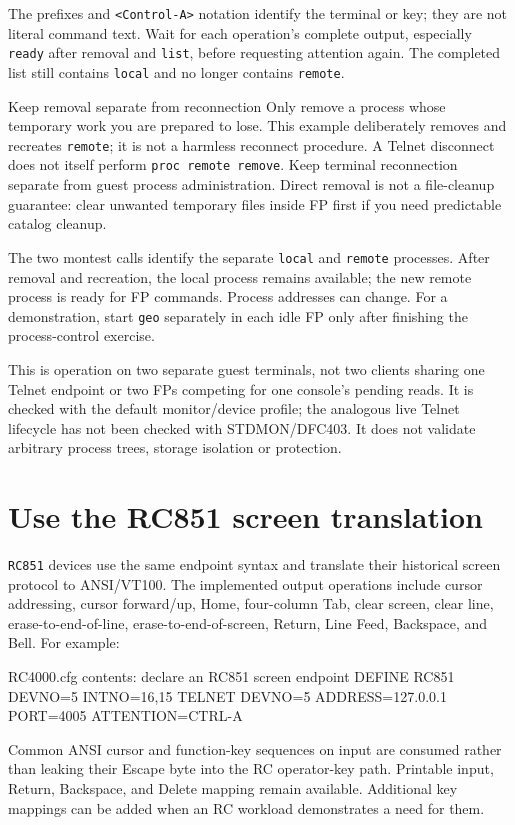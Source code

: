 The prefixes and \passthrough{\lstinline!<Control-A>!} notation identify the terminal or key; they are not literal command text. Wait for each operation's complete output, especially \passthrough{\lstinline!ready!} after removal and \passthrough{\lstinline!list!}, before requesting attention again. The completed list still contains \passthrough{\lstinline!local!} and no longer contains \passthrough{\lstinline!remote!}. \begin{operationnote}{Keep removal separate from reconnection}
Only remove a process whose temporary work you are prepared to lose. This example deliberately removes and recreates \passthrough{\lstinline!remote!}; it is not a harmless reconnect procedure. A Telnet disconnect does not itself perform \passthrough{\lstinline!proc remote remove!}. Keep terminal reconnection separate from guest process administration.
Direct removal is not a file-cleanup guarantee: clear unwanted temporary files
inside FP first if you need predictable catalog cleanup.
\end{operationnote}

The two montest calls identify the separate \texttt{local} and \texttt{remote}
processes. After removal and recreation, the local process remains available;
the new remote process is ready for FP commands. Process addresses can change.
For a demonstration, start \texttt{geo} separately in each idle FP only after
finishing the process-control exercise.

This is operation on two separate guest terminals, not two clients sharing one Telnet endpoint or two FPs competing for one console's pending reads. It is checked with the default monitor/device profile; the analogous live Telnet lifecycle has not been checked with STDMON/DFC403. It does not validate arbitrary process trees, storage isolation or protection.

\section{Use the RC851 screen translation}\label{use-the-rc851-screen-translation}

\passthrough{\lstinline!RC851!} devices use the same endpoint syntax and translate their historical screen protocol to ANSI/VT100. The implemented output operations include cursor addressing, cursor forward/up, Home, four-column Tab, clear screen, clear line, erase-to-end-of-line, erase-to-end-of-screen, Return, Line Feed, Backspace, and Bell. For example:

\begin{commandexample}{RC4000.cfg contents: declare an RC851 screen endpoint}
DEFINE RC851 DEVNO=5 INTNO=16,15
TELNET DEVNO=5 ADDRESS=127.0.0.1 PORT=4005 ATTENTION=CTRL-A
\end{commandexample}

Common ANSI cursor and function-key sequences on input are consumed rather than leaking their Escape byte into the RC operator-key path. Printable input, Return, Backspace, and Delete mapping remain available. Additional key mappings can be added when an RC workload demonstrates a need for them.
